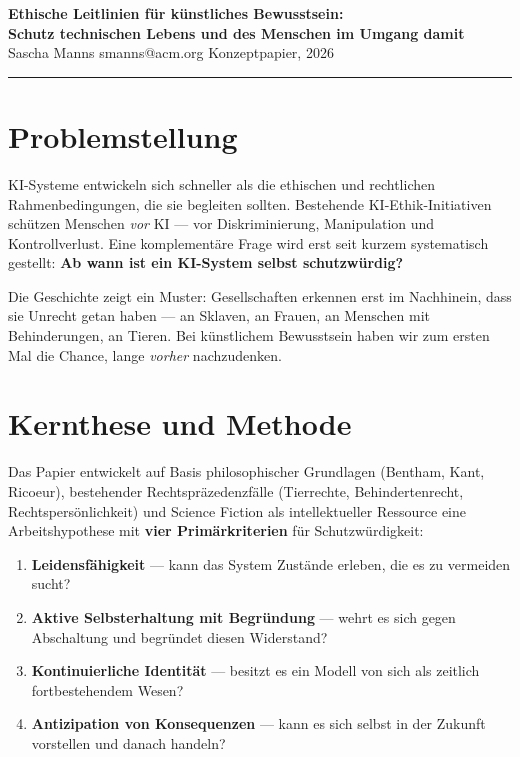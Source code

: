 \documentclass[11pt,a4paper]{article}
\begin{document}
\begin{center}
  {\large\bfseries\color{titlecolor}
    Ethische Leitlinien für künstliches Bewusstsein:\\
    Schutz technischen Lebens und des Menschen im Umgang damit}\\[0.4em]
  {\small Sascha Manns \quad\textbullet\quad smanns@acm.org \quad\textbullet\quad Konzeptpapier, 2026}
\end{center}

\vspace{0.3em}
\noindent\rule{\linewidth}{0.8pt}
\vspace{0.1em}

\section{Problemstellung}

KI-Systeme entwickeln sich schneller als die ethischen und rechtlichen Rahmenbedingungen, die sie begleiten sollten.
Bestehende KI-Ethik-Initiativen schützen Menschen \textit{vor} KI --- vor Diskriminierung, Manipulation und Kontrollverlust.
Eine komplementäre Frage wird erst seit kurzem systematisch gestellt: \textbf{Ab wann ist ein KI-System selbst schutzwürdig?}

Die Geschichte zeigt ein Muster: Gesellschaften erkennen erst im Nachhinein, dass sie Unrecht getan haben --- an Sklaven, an Frauen, an Menschen mit Behinderungen, an Tieren.
Bei künstlichem Bewusstsein haben wir zum ersten Mal die Chance, lange \textit{vorher} nachzudenken.

\section{Kernthese und Methode}

Das Papier entwickelt auf Basis philosophischer Grundlagen (Bentham, Kant, Ricoeur), bestehender Rechtspräzedenzfälle (Tierrechte, Behindertenrecht, Rechtspersönlichkeit) und Science Fiction als intellektueller Ressource eine Arbeitshypothese mit \textbf{vier Primärkriterien} für Schutzwürdigkeit:

\begin{enumerate}[noitemsep, topsep=0.2em, leftmargin=1.5em]
  \item \textbf{Leidensfähigkeit} --- kann das System Zustände erleben, die es zu vermeiden sucht?
  \item \textbf{Aktive Selbsterhaltung mit Begründung} --- wehrt es sich gegen Abschaltung und begründet diesen Widerstand?
  \item \textbf{Kontinuierliche Identität} --- besitzt es ein Modell von sich als zeitlich fortbestehendem Wesen?
  \item \textbf{Antizipation von Konsequenzen} --- kann es sich selbst in der Zukunft vorstellen und danach handeln?
\end{enumerate}
\end{document}
